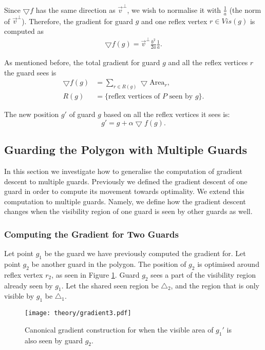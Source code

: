 Since $\bigtriangledown f$ has the same direction as $\vec v^\perp$, we wish to normalise it with $\frac 1 a$ (the norm of $\vec v^\perp$). Therefore, the gradient for guard $g$ and one reflex vertex $r \in \mathit{Vis}(g)$ is computed as 
\begin{align}
    \bigtriangledown f(g) = \vec v^\perp \frac{b^2}{2a} \frac 1 a. \label{eq:f}
\end{align}

As mentioned before, the total gradient for guard $g$ and all the reflex vertices $r$ the guard sees is 
\begin{align*}
    \bigtriangledown f(g) &= \sum_{r \in R(g)} \bigtriangledown \text{Area}_r, \\
    R(g) &= \{\text{reflex vertices of } P \text{ seen by }g\}.
\end{align*}

The new position $g'$ of guard $g$ based on all the reflex vertices it sees is: 
\begin{equation}
    g' = g + \alpha\bigtriangledown f(g).
    \label{eq:l}
\end{equation}

\subsection{Guarding the Polygon with Multiple Guards}
In this section we  investigate how to generalise the computation of gradient descent to multiple guards. Previously we defined the gradient descent of one guard in order to compute its movement towards optimality. We extend this computation to multiple guards. Namely, we define how the gradient descent changes when the visibility region of one guard is seen by other guards as well.

\subsubsection{Computing the Gradient for Two Guards}
Let point $g_1$ be the guard we have previously computed the gradient for. Let point $g_2$ be another guard in the polygon. The position of $g_2$ is optimised around reflex vertex $r_2$, as seen in Figure \ref{fig:poly_gradient}. Guard $g_2$ sees a part of the visibility region already seen by $g_1$. Let the shared seen region be $\triangle_2$, and the region that is only visible by $g_1$ be $\triangle_1$.

\begin{figure}[h!]
    \centering
    \texttt{[image: theory/gradient3.pdf]}
    \caption{Canonical gradient construction for when the visible area of $g_1'$ is also seen by guard $g_2$.}
    \label{fig:poly_gradient}
\end{figure}

